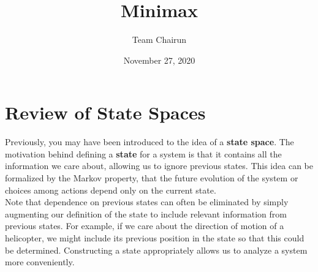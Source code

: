 \documentclass[12pt, letterpaper]{article}
\title{Minimax}
\author{Team Chairun}
\date{November 27, 2020}
\begin{document}
\maketitle

\section*{Review of State Spaces}
Previously, you may have been introduced to the idea of a \textbf{state space}. The motivation behind defining a \textbf{state} for a system is that it contains all the information we care about, allowing us to ignore previous states. This idea can be formalized by the Markov property, that the future evolution of the system or choices among actions depend only on the current state. \\[0.2cm]
Note that dependence on previous states can often be eliminated by simply augmenting our definition of the state to include relevant information from previous states. For example, if we care about the direction of motion of a helicopter, we might include its previous position in the state so that this could be determined. Constructing a state appropriately allows us to analyze a system more conveniently.
\end{document}

